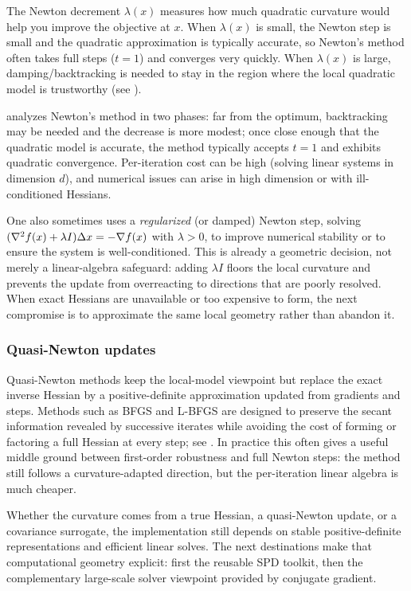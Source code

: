The Newton decrement $\lambda(x)$ measures how much quadratic curvature would help you improve the objective at $x$.
When $\lambda(x)$ is small, the Newton step is small and the quadratic approximation is typically accurate, so Newton's method often takes full steps ($t=1$) and converges very quickly.
When $\lambda(x)$ is large, damping/backtracking is needed to stay in the region where the local quadratic model is trustworthy (see \citet[\S9.5.3]{boyd_vandenberghe_2004_convex}).

\citet[\S9.5.3]{boyd_vandenberghe_2004_convex} analyzes Newton's method in two phases:
far from the optimum, backtracking may be needed and the decrease is more modest; once close enough that the quadratic model is accurate, the method typically accepts $t=1$ and exhibits quadratic convergence.
Per-iteration cost can be high (solving linear systems in dimension $d$), and numerical issues can arise in high dimension or with ill-conditioned Hessians.

One also sometimes uses a \emph{regularized} (or damped) Newton step, solving $(\nabla^2 f(x)+\lambda I)\Delta x = -\nabla f(x)$ with $\lambda>0$, to improve numerical stability or to ensure the system is well-conditioned.
This is already a geometric decision, not merely a linear-algebra safeguard: adding $\lambda I$ floors the local curvature and prevents the update from overreacting to directions that are poorly resolved.
When exact Hessians are unavailable or too expensive to form, the next compromise is to approximate the same local geometry rather than abandon it.

\subsubsection{Quasi-Newton updates}
\label{subsubsec:quasi-newton}

Quasi-Newton methods keep the local-model viewpoint but replace the exact inverse Hessian by a positive-definite approximation updated from gradients and steps.
Methods such as BFGS and L-BFGS are designed to preserve the secant information revealed by successive iterates while avoiding the cost of forming or factoring a full Hessian at every step; see \citet[\S6.1--\S6.2]{nocedal_wright_2006_numerical}.
In practice this often gives a useful middle ground between first-order robustness and full Newton steps: the method still follows a curvature-adapted direction, but the per-iteration linear algebra is much cheaper.

Whether the curvature comes from a true Hessian, a quasi-Newton update, or a covariance surrogate, the implementation still depends on stable positive-definite representations and efficient linear solves.
The next destinations make that computational geometry explicit: first the reusable SPD toolkit, then the complementary large-scale solver viewpoint provided by conjugate gradient.
